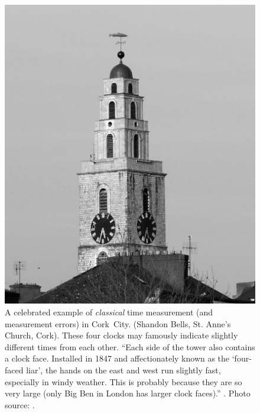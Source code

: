 \begin{savenotes}
\begin{figure}[]
  \centering
  \includegraphics[height=.5\textheight]{img/Shandon_bells_cork.BW.jpg}
  \caption[
    Classical Time. The \emph{Four Faced Liar}, Shandon Bells, Cork
  ]{
    A celebrated example of \emph{classical} time measurement (and measurement errors) in Cork~City.
    (Shandon Bells, St. Anne's Church, Cork).
    These four clocks
    may famously
    indicate slightly different times from each other.
    ``Each side of the tower also contains a clock face.
    Installed in 1847 and affectionately known as the
    `four-faced liar', the hands on the east and west run slightly fast, especially in windy weather.
    This is probably because they are so very large
    (only Big Ben in London has larger clock faces).''
    \parencite{CorkStrolls}. Photo source: \cite{ShandonBells}.
  }
  \label{fig:ShandonBells}
\end{figure}
\end{savenotes}